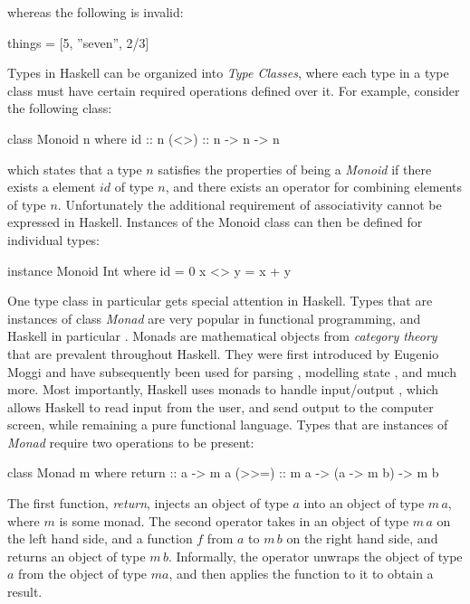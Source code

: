 \documentclass[thesis.tex]{subfiles}
\begin{document}
whereas the following is invalid:

\begin{spec}
things = [5, ''seven'', 2/3]
\end{spec}

Types in Haskell can be organized into \emph{Type Classes}, where each type in a
type class must have certain required operations defined over it. For example, consider
the following class:

\begin{spec}
class Monoid n where
    id  :: n
    (<>) :: n -> n -> n
\end{spec}

which states that a type $n$ satisfies the properties of being a \emph{Monoid} if there exists
a element $id$ of type $n$, and there exists an operator for combining elements of type $n$.
Unfortunately the additional requirement of associativity cannot be expressed in Haskell.
Instances of the Monoid class can then be defined for individual types:

\begin{spec}
instance Monoid Int where
    id = 0
    x <> y = x + y
\end{spec}

One type class in particular gets special attention in Haskell. Types that are instances of
class \emph{Monad} are very popular in functional programming, and Haskell in particular \cite{peyton1993imperative}. Monads
are mathematical objects from \emph{category theory} that are prevalent throughout Haskell.
They were first introduced by Eugenio Moggi \cite{moggi1991notions} and have subsequently been
used for parsing \cite{hutton1998monadic, leijen2001parsec, hafiz2010lazy}, modelling state
\cite{launchbury1994lazy}, and much more. Most
importantly, Haskell uses monads to handle input/output \cite{peyton1993imperative}, which allows Haskell to read
input from the user, and send output to the computer screen, while remaining a pure functional
language. Types that are instances of \emph{Monad} require two operations to be present:

\begin{spec}
class Monad m where
    return :: a -> m a
    (>>=)  :: m a -> (a -> m b) -> m b
\end{spec}

The first function, \emph{return}, injects an object of type $a$ into an object of type $m\,a$, where
$m$ is some monad. The second operator takes in an object of type $m\,a$ on the left hand side, and
a function $f$ from $a$ to $m\,b$ on the right hand side, and returns an object of type $m\,b$.
Informally, the operator unwraps the object of type $a$ from the object of type $m a$, and then applies
the function to it to obtain a result.
\end{document}

